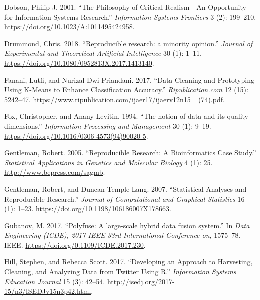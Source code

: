 \documentclass[
]{article}
\newlength{\cslhangindent}
\newlength{\cslentryspacingunit} %
\newenvironment{CSLReferences}[2] %
 {%
  \setlength{\parindent}{0pt}
  \ifodd #1
  \let\oldpar\par
  \def\par{\hangindent=\cslhangindent\oldpar}
  \fi
  \setlength{\parskip}{#2\cslentryspacingunit}
 }%
 {}
\begin{document}
\begin{CSLReferences}{1}{0}
\leavevmode{}%
Dobson, Philip J. 2001. {``{The Philosophy of Critical Realism - An
Opportunity for Information Systems Research}.''} \emph{Information
Systems Frontiers} 3 (2): 199--210.
\url{https://doi.org/10.1023/A:1011495424958}.

\leavevmode{}%
Drummond, Chris. 2018. {``{Reproducible research: a minority
opinion}.''} \emph{Journal of Experimental and Theoretical Artificial
Intelligence} 30 (1): 1--11.
\url{https://doi.org/10.1080/0952813X.2017.1413140}.

\leavevmode{}%
Fanani, Lutfi, and Nurizal Dwi Priandani. 2017. {``{Data Cleaning and
Prototyping Using K-Means to Enhance Classification Accuracy}.''}
\emph{Ripublication.com} 12 (15): 5242--47.
\href{https://www.ripublication.com/ijaer17/ijaerv12n15_\%20(74).pdf}{https://www.ripublication.com/ijaer17/ijaerv12n15\_
(74).pdf}.

\leavevmode{}%
Fox, Christopher, and Anany Levitin. 1994. {``{The notion of data and
its quality dimensions}.''} \emph{Information Processing and Management}
30 (1): 9--19. \url{https://doi.org/10.1016/0306-4573(94)90020-5}.

\leavevmode{}%
Gentleman, Robert. 2005. {``{Reproducible Research: A Bioinformatics
Case Study}.''} \emph{Statistical Applications in Genetics and Molecular
Biology} 4 (1): 25. \url{http://www.bepress.com/sagmb}.

\leavevmode{}%
Gentleman, Robert, and Duncan Temple Lang. 2007. {``{Statistical
Analyses and Reproducible Research}.''} \emph{Journal of Computational
and Graphical Statistics} 16 (1): 1--23.
\url{https://doi.org/10.1198/106186007X178663}.

\leavevmode{}%
Gubanov, M. 2017. {``{Polyfuse: A large-scale hybrid data fusion
system}.''} In \emph{Data Engineering (ICDE), 2017 IEEE 33rd
International Conference on}, 1575--78. IEEE.
\url{https://doi.org/0.1109/ICDE.2017.230}.

\leavevmode{}%
Hill, Stephen, and Rebecca Scott. 2017. {``{Developing an Approach to
Harvesting, Cleaning, and Analyzing Data from Twitter Using R}.''}
\emph{Information Systems Education Journal} 15 (3): 42--54.
\url{http://isedj.org/2017-15/n3/ISEDJv15n3p42.html}.


\end{CSLReferences}
\end{document}
